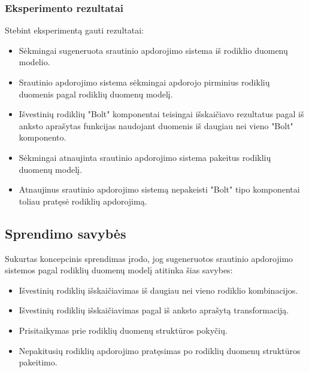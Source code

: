 \documentclass{VUMIFPSbakalaurinis}
\begin{document}
\subsubsection{Eksperimento rezultatai}
Stebint eksperimentą gauti rezultatai:
\begin{itemize}
    \item Sėkmingai sugeneruota srautinio apdorojimo sistema iš rodiklio duomenų modelio.
    \item Srautinio apdorojimo sistema sėkmingai apdorojo pirminius rodiklių duomenis pagal rodiklių duomenų modelį.
    \item Išvestinių rodiklių "Bolt" komponentai teisingai išskaičiavo rezultatus pagal iš anksto aprašytas funkcijas naudojant duomenis iš daugiau nei vieno "Bolt" komponento.
    \item Sėkmingai atnaujinta srautinio apdorojimo sistema pakeitus rodiklių duomenų modelį.
    \item Atnaujinus srautinio apdorojimo sistemą nepakeisti "Bolt" tipo komponentai toliau pratęsė rodiklių apdorojimą. 
\end{itemize}
\subsection{Sprendimo savybės}

Sukurtas koncepcinis sprendimas įrodo, jog sugeneruotos srautinio apdorojimo sistemos pagal rodiklių duomenų modelį atitinka šias savybes:
\begin{itemize}
    \item Išvestinių rodiklių išskaičiavimas iš daugiau nei vieno rodiklio kombinacijos.
    \item Išvestinių rodiklių išskaičiavimas pagal iš anksto aprašytą transformaciją.
    \item Prisitaikymas prie rodiklių duomenų struktūros pokyčių. 
    \item Nepakitusių rodiklių apdorojimo pratęsimas po rodiklių duomenų struktūros pakeitimo.
\end{itemize} 

\end{document}
